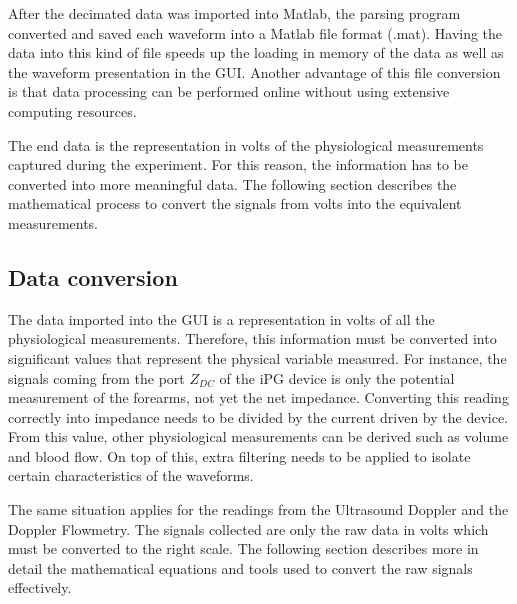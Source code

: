 After the decimated data was imported into Matlab, the parsing program converted and saved each waveform into a Matlab file format (.mat). Having the data into this kind of file speeds up the loading in memory of the data as well as the waveform presentation in the GUI. Another advantage of this file conversion is that data processing can be performed online without using extensive computing resources. 

The end data is the representation in volts of the physiological measurements captured during the experiment. For this reason, the information has to be converted into more meaningful data. The following section describes the mathematical process to convert the signals from volts into the equivalent measurements.

\subsection{Data conversion}
\label{section procedure data conversion}
The data imported into the GUI is a representation in volts of all the physiological measurements. Therefore, this information must be converted into significant values that represent the physical variable measured. For instance, the signals coming from the port $Z_{DC}$ of the iPG device is only the potential measurement of the forearms, not yet the net impedance. Converting this reading correctly into impedance needs to be divided by the current driven by the device. From this value, other physiological measurements can be derived such as volume and blood flow. On top of this, extra filtering needs to be applied to isolate certain characteristics of the waveforms. 

The same situation applies for the readings from the Ultrasound Doppler and the Doppler Flowmetry. The signals collected are only the raw data in volts which must be converted to the right scale. The following section describes more in detail the mathematical equations and tools used to convert the raw signals effectively.  

